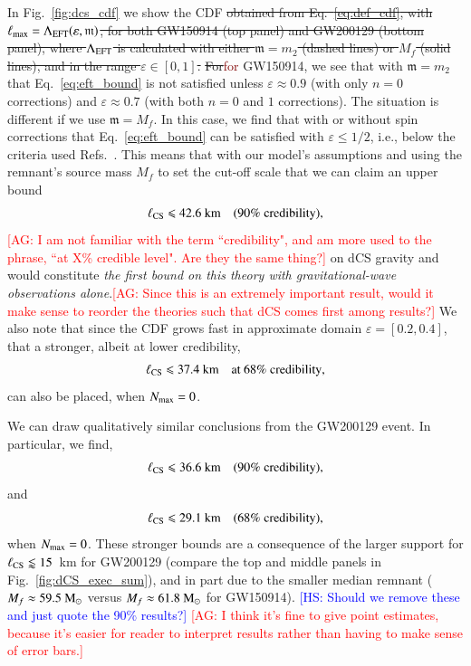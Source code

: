\documentclass[twocolumn,
               prd,
               aps,
               superscriptaddress,
               tightenlines,
               nofootinbib,
               eqsecnum,
               amsfonts,
               amsmath,
               longbibliography]{revtex4-1}
\newcommand{\gm}{\mathfrak{m}}
\newcommand{\msun}{~{\rm M}_{\odot}}
\newcommand{\agcomm}[1]{{\textcolor{red}{{[AG: #1]}} }}
\newcommand{\ag}[1]{{\textcolor{Maroon}{{#1}} }}
\newcommand{\hs}[1]{{\textcolor{blue}{{[HS: #1]}} }}
\begin{document}
In Fig.~\ref{fig:dcs_cdf} we show the CDF
\sout{obtained from Eq.~\eqref{eq:def_cdf}, with $\ell_{\rm max} = \Lambda_{\rm EFT} (\varepsilon, \gm)$,
for both GW150914 (top panel) and GW200129 (bottom panel), where $\Lambda_{\rm EFT}$
is calculated with either $\gm = m_2$ (dashed lines) or $M_{f}$ (solid lines),
and in the range $\varepsilon \in [0,1]$.}
%
\sout{For}\ag{for} GW150914, we see that with $\gm = m_2$ that Eq.~\eqref{eq:eft_bound} is not
satisfied unless $\varepsilon \approx 0.9$ (with only $n=0$ corrections) and
$\varepsilon \approx 0.7$ (with both $n=0$ and $1$ corrections).
%
The situation is different if we use $\gm = M_f$. In this case, we find that
with or without spin corrections that Eq.~\eqref{eq:eft_bound} can be satisfied
with $\varepsilon \leqslant 1/2$, i.e., below the criteria used
Refs.~\cite{Nair:2019iur,Perkins:2021mhb,Lyu:2022gdr}.
%
This means that with our model's assumptions and using the remnant's source mass $M_f$ to set the
cut-off scale that we can claim an upper bound
%
\begin{equation}
\ell_{\rm CS} \leqslant 42.6~\textrm{km}
\quad \textrm{(90\% credibility)},
\end{equation}
\agcomm{I am not familiar with the term ``credibility", and am more used to the phrase, ``at X\% credible level". 
Are they the same thing?}
%
on dCS gravity and would constitute \emph{the first bound on this theory with
gravitational-wave observations alone}.\agcomm{Since this is an extremely important
result, would it make sense to reorder the theories such that dCS comes first among results?}
%
We also note that since the CDF grows fast in approximate domain $\varepsilon = [0.2, 0.4]$,
that a stronger, albeit at lower credibility,
%
\begin{equation}
\ell_{\rm CS} \leqslant 37.4~\textrm{km}
\quad \textrm{at 68\% credibility},
\end{equation}
%
can also be placed, when $N_{\rm max}=0$.

We can draw qualitatively similar conclusions from the GW200129 event.
In particular, we find,
%
\begin{equation}
\ell_{\rm CS} \leqslant 36.6~\textrm{km}
\quad \textrm{(90\% credibility)},
\end{equation}
%
and
%
\begin{equation}
\ell_{\rm CS} \leqslant 29.1~\textrm{km}
\quad \textrm{(68\% credibility)},
\end{equation}
%
when $N_{\rm max}=0$.
%
These stronger bounds are a consequence of the larger support for $\ell_{\rm CS} \lessapprox 15$~km
for GW200129 (compare the top and middle panels in Fig.~\ref{fig:dCS_exec_sum}), and in part due to
the smaller median remnant ($M_{f} \approx 59.5\msun$ versus $M_{f} \approx 61.8\msun$ for GW150914).
%
\hs{Should we remove these and just quote the 90\% results?}\agcomm{I think
it's fine to give point estimates, because it's easier for reader to interpret results 
rather than having to make sense of error bars.}
\end{document}
